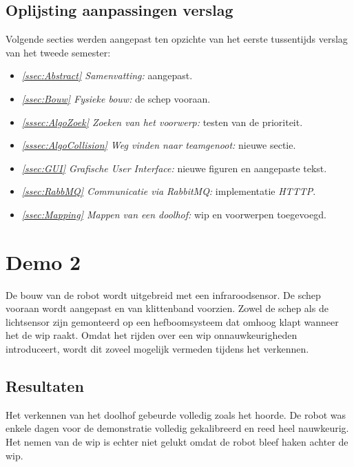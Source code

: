 \documentclass[eind]{penoverslag}
\begin{document}
\subsection{Oplijsting aanpassingen verslag}
\label{Assec:aanp1}
Volgende secties werden aangepast ten opzichte van het eerste tussentijds verslag van het tweede semester:

\begin{itemize}
\item \textit{\ref{ssec:Abstract} Samenvatting:} aangepast.
\item \textit{\ref{ssec:Bouw} Fysieke bouw:} de schep vooraan.
\item \textit{\ref{sssec:AlgoZoek} Zoeken van het voorwerp:} testen van de prioriteit.
\item \textit{\ref{sssec:AlgoCollision} Weg vinden naar teamgenoot:} nieuwe sectie.
\item \textit{\ref{ssec:GUI} Grafische User Interface:} nieuwe figuren en aangepaste tekst.
\item \textit{\ref{ssec:RabbMQ} Communicatie via RabbitMQ:} implementatie \textit{HTTTP}.
\item \textit{\ref{ssec:Mapping} Mappen van een doolhof:} wip en voorwerpen toegevoegd.
\end{itemize}

\section{Demo 2}
\label{Asec:demo2}
De bouw van de robot wordt uitgebreid met een infraroodsensor. De schep vooraan wordt aangepast en van klittenband voorzien. Zowel de schep als de lichtsensor zijn gemonteerd op een hefboomsysteem dat omhoog klapt wanneer het de wip raakt. Omdat het rijden over een wip onnauwkeurigheden introduceert, wordt dit zoveel mogelijk vermeden tijdens het verkennen.

\subsection{Resultaten}
\label{Assec:result2}
Het verkennen van het doolhof gebeurde volledig zoals het hoorde. De robot was enkele dagen voor de demonstratie volledig gekalibreerd en reed heel nauwkeurig. Het nemen van de wip is echter niet gelukt omdat de robot bleef haken achter de wip.
\end{document}
